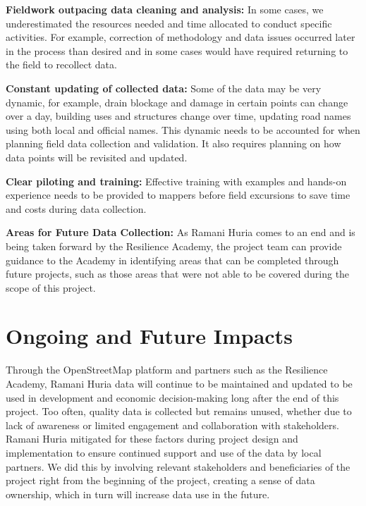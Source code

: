\documentclass[a4paper,12pt,twoside]{article}
\begin{document}
\textbf{Fieldwork outpacing data cleaning and analysis:} In some cases, we underestimated the resources needed and time allocated to conduct specific activities. For example, correction of methodology and data issues occurred later in the process than desired and in some cases would have required returning to the field to recollect data.   

\textbf{Constant updating of collected data:} Some of the data may be very dynamic, for example, drain blockage and damage in certain points can change over a day, building uses and structures change over time, updating road names using both local and official names. This dynamic needs to be accounted for when planning field data collection and validation. It also requires planning on how data points will be revisited and updated. 

\textbf{Clear piloting and training:} Effective training with examples and hands-on experience needs to be provided to mappers before field excursions to save time and costs during data collection.

\begin{mdframed}[hidealllines=true,backgroundcolor=RHgreen!10,innerleftmargin=6pt,innerrightmargin=6pt,leftmargin=-3pt,rightmargin=-3pt]
\textbf{Areas for Future Data Collection:}
As Ramani Huria comes to an end and is being taken forward by the Resilience Academy, the project team can provide guidance to the Academy in identifying areas that can be completed through future projects, such as those areas that were not able to be covered during the scope of this project.
\end{mdframed}

\section{Ongoing and Future Impacts}

Through the OpenStreetMap platform and partners such as the Resilience Academy, Ramani Huria data will continue to be maintained and updated to be used in development and economic decision-making long after the end of this project. Too often, quality data is collected but remains unused, whether due to lack of awareness or limited engagement and collaboration with stakeholders. Ramani Huria mitigated for these factors during project design and implementation to ensure continued support and use of the data by local partners. We did this by involving relevant stakeholders and beneficiaries of the project right from the beginning of the project, creating a sense of data ownership, which in turn will increase data use in the future.
\end{document}

